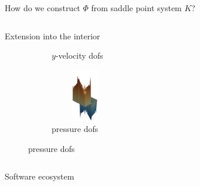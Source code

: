 \begin{frame}{How do we construct $\varPhi$ from saddle point system $K$?}
\begin{columns}
\begin{column}{0.52\textwidth}
{\begin{block}{\normalsize Extension into the interior}
\begin{figure}
\begin{subfigure}{0.29\textwidth}
							\vspace*{-5mm}
							\caption{$y$-velocity dofs}
						\end{subfigure}
                        \hspace{12mm}
						\begin{subfigure}{0.29\textwidth}
							\centering
                            \includegraphics[width=3cm,height=23mm]{images/RGDSW-p-cut.png}
							\vspace*{-5mm}
							\caption{pressure dofs}
						\end{subfigure}
					\end{figure}
                    \vspace{-2mm}
				\end{block}
			}
		\end{column}
	\end{columns}
\end{frame}

\begin{frame}{Software ecosystem}
	
\end{frame}


